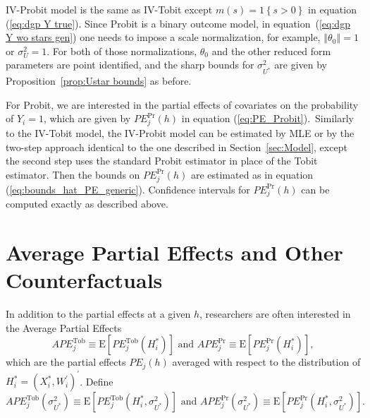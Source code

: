 \documentclass[12pt]{article}
\begin{document}
IV-Probit model is the same as IV-Tobit except $m\left( s\right) =1\left\{ s>0\right\} $ in equation (\ref{eq:dgp Y true}). Since Probit is a binary outcome model, in equation~(\ref{eq:dgp Y wo stars gen}) one needs to impose a scale normalization, for example, $\left\Vert \theta _{0}\right\Vert =1$ or $\sigma_{U}^2 = 1$. For both of those normalizations, $\theta_0$ and the other reduced form parameters are point identified, and the sharp bounds for $\sigma_{U^*}^2$ are given by Proposition~\ref{prop:Ustar bounds} as before.

For Probit, we are interested in the partial effects of
covariates on the probability of $Y_{i}=1$, which are given by $PE_{j}^{\Pr
}\left( h\right) $ in equation (\ref{eq:PE_Probit}).\ Similarly to the
IV-Tobit model, the IV-Probit model can be estimated by MLE or by the
two-step approach identical to the one described in Section~\ref{sec:Model},
except the second step uses the standard Probit estimator in place of the
Tobit estimator. Then the bounds on $PE_{j}^{\Pr }\left( h\right) $ are
estimated as in equation (\ref{eq:bounds_hat_PE_generic}).%
{}
Confidence intervals for $PE_{j}^{\Pr }(h)$ can be computed exactly as
described above.

\bigskip

\section{Average Partial Effects and Other Counterfactuals}\label%
{sec:APEs}

In addition to the partial effects at a given $h$, researchers are often
interested in the Average Partial Effects%
\begin{equation}
APE_{j}^{\text{Tob}}\equiv \mathrm{E}\left[ PE_{j}^{\text{Tob}}\left(
H_{i}^{\ast }\right) \right] \text{ and }APE_{j}^{\Pr }\equiv \mathrm{E}%
\left[ PE_{j}^{\Pr }\left( H_{i}^{\ast }\right) \right] ,
\label{eq:APEs def}
\end{equation}%
which are the partial effects $PE_{j}\left( h\right) $ averaged with respect
to the distribution of {}$H_{i}^{\ast }=\left(
X_{i}^{\ast },W_{i}^{\prime }\right) ^{\prime }$. Define%
\begin{equation*}
APE_{j}^{\text{Tob}}\left( \sigma _{U^{\ast }}^{2}\right) \equiv \mathrm{E}%
\left[ PE_{j}^{\text{Tob}}\left( H_{i}^{\ast },\sigma _{U^{\ast
}}^{2}\right) \right] \text{ and }APE_{j}^{\Pr }\left( \sigma _{U^{\ast
}}^{2}\right) \equiv \mathrm{E}\left[ PE_{j}^{\Pr }\left( H_{i}^{\ast
},\sigma _{U^{\ast }}^{2}\right) \right] .
\end{equation*}
\end{document}
